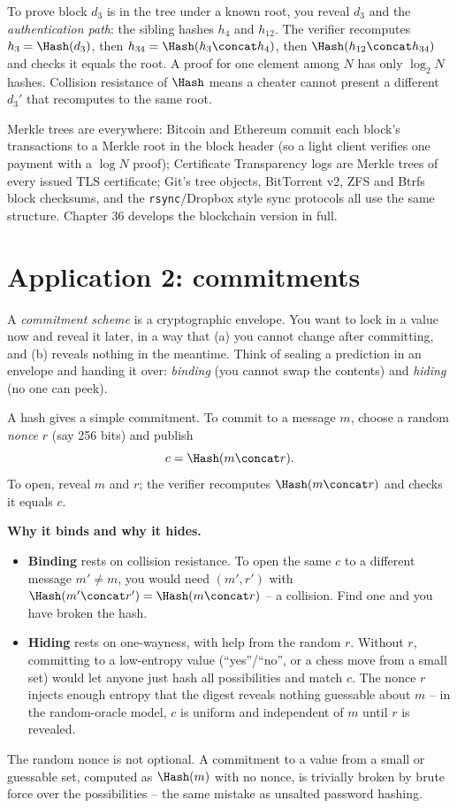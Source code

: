 To prove block $d_3$ is in the tree under a known root, you reveal $d_3$ and the \emph{authentication path}: the sibling hashes $h_4$ and $h_{12}$. The verifier recomputes $h_3 = \Hash(d_3)$, then $h_{34} = \Hash(h_3 \concat h_4)$, then $\Hash(h_{12} \concat h_{34})$ and checks it equals the root. A proof for one element among $N$ has only $\log_2 N$ hashes. Collision resistance of $\Hash$ means a cheater cannot present a different $d_3'$ that recomputes to the same root.

\begin{applicationbox}
Merkle trees are everywhere: Bitcoin and Ethereum commit each block's transactions to a Merkle root in the block header (so a light client verifies one payment with a $\log N$ proof); Certificate Transparency logs are Merkle trees of every issued TLS certificate; Git's tree objects, BitTorrent v2, ZFS and Btrfs block checksums, and the \texttt{rsync}/Dropbox style sync protocols all use the same structure. Chapter 36 develops the blockchain version in full.
\end{applicationbox}

\section{Application 2: commitments}
\label{ch14:commitments}

A \emph{commitment scheme} is a cryptographic envelope. You want to lock in a value now and reveal it later, in a way that (a) you cannot change after committing, and (b) reveals nothing in the meantime. Think of sealing a prediction in an envelope and handing it over: \emph{binding} (you cannot swap the contents) and \emph{hiding} (no one can peek).

A hash gives a simple commitment. To commit to a message $m$, choose a random \emph{nonce} $r$ (say 256 bits) and publish
\[
  c = \Hash(m \concat r).
\]
To open, reveal $m$ and $r$; the verifier recomputes $\Hash(m \concat r)$ and checks it equals $c$.

\begin{whybox}
\textbf{Why it binds and why it hides.}
\begin{itemize}
  \item \textbf{Binding} rests on collision resistance. To open the same $c$ to a different message $m' \ne m$, you would need $(m', r')$ with $\Hash(m' \concat r') = \Hash(m \concat r)$ -- a collision. Find one and you have broken the hash.
  \item \textbf{Hiding} rests on one-wayness, with help from the random $r$. Without $r$, committing to a low-entropy value (``yes''/``no'', or a chess move from a small set) would let anyone just hash all possibilities and match $c$. The nonce $r$ injects enough entropy that the digest reveals nothing guessable about $m$ -- in the random-oracle model, $c$ is uniform and independent of $m$ until $r$ is revealed.
\end{itemize}
The random nonce is not optional. A commitment to a value from a small or guessable set, computed as $\Hash(m)$ with no nonce, is trivially broken by brute force over the possibilities -- the same mistake as unsalted password hashing.
\end{whybox}

